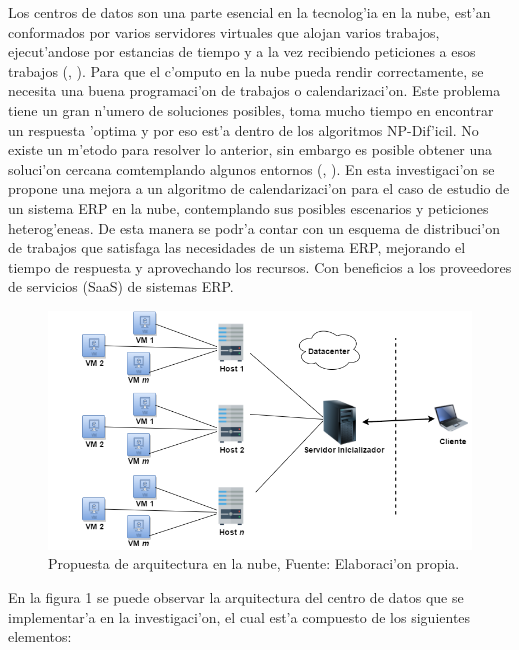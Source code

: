 Los centros de datos son una parte esencial en la tecnolog'ia en la nube, est'an conformados por varios servidores virtuales que alojan varios trabajos, ejecut'andose por estancias de tiempo y a la vez recibiendo peticiones a esos trabajos (\citeauthor{shimpy2014different}, \citeyear{shimpy2014different}).
Para que el c'omputo en la nube pueda rendir correctamente, se necesita una buena programaci'on de trabajos o calendarizaci'on. Este problema tiene un gran n'umero de soluciones posibles, toma mucho tiempo en encontrar un respuesta 'optima y por eso est'a dentro de los algoritmos NP-Dif'icil. No existe un m'etodo para resolver lo anterior, sin embargo es posible obtener una soluci'on cercana comtemplando algunos entornos (\citeauthor{shimpy2014different}, \citeyear{shimpy2014different}).
En esta investigaci'on se propone una mejora a un algoritmo de calendarizaci'on para el caso de estudio de un sistema ERP en la nube, contemplando sus posibles escenarios y peticiones heterog'eneas. De esta manera se podr'a contar con un esquema de distribuci'on de trabajos que satisfaga las necesidades de un sistema ERP, mejorando el tiempo de respuesta y aprovechando los recursos. Con beneficios a los proveedores de servicios (SaaS) de sistemas ERP.

\newpage

\begin{figure}
	
	\centering
	\includegraphics[scale=0.5]{media/cloud2}
	\caption{Propuesta de arquitectura en la nube, Fuente: Elaboraci'on propia. }
\end{figure}


En la figura 1 se puede observar la arquitectura del centro de datos que se implementar'a en la investigaci'on, el cual est'a compuesto de los siguientes elementos:

